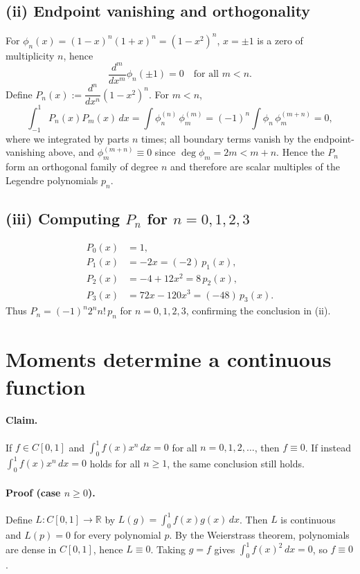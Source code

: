 \documentclass[11pt,a4paper]{article}
\theoremstyle{definition}
\theoremstyle{definition}
\theoremstyle{plain}
\theoremstyle{remark}
\begin{document}
\subsection*{(ii) Endpoint vanishing and orthogonality}
For \(\phi_n(x)=(1-x)^n(1+x)^n=(1-x^2)^n\),
\(x=\pm1\) is a zero of multiplicity \(n\), hence
\[
\frac{d^m}{dx^m}\phi_n(\pm1)=0\quad\text{for all }m<n.
\]
Define \(P_n(x):=\dfrac{d^n}{dx^n}(1-x^2)^n\).
For \(m<n\),
\[
\int_{-1}^{1} P_n(x)P_m(x)\,dx
=\int \phi_n^{(n)}\,\phi_m^{(m)}
=(-1)^n\!\int \phi_n\,\phi_m^{(m+n)}=0,
\]
where we integrated by parts \(n\) times; all boundary terms vanish by the endpoint-vanishing above, and \(\phi_m^{(m+n)}\equiv0\) since \(\deg\phi_m=2m<m+n\).
Hence the \(P_n\) form an orthogonal family of degree \(n\) and therefore are scalar multiples of the Legendre polynomials \(p_n\).

\subsection*{(iii) Computing \(P_n\) for \(n=0,1,2,3\)}
\[
\begin{aligned}
	P_0(x)&=1,\\
	P_1(x)&=-2x=(-2)\,p_1(x),\\
	P_2(x)&=-4+12x^2=8\,p_2(x),\\
	P_3(x)&=72x-120x^3=(-48)\,p_3(x).
\end{aligned}
\]
Thus \(P_n=(-1)^n 2^n n!\,p_n\) for \(n=0,1,2,3\), confirming the conclusion in (ii).


\section*{Moments determine a continuous function}

\paragraph{Claim.}
If \(f\in C[0,1]\) and \(\int_0^1 f(x)x^n\,dx=0\) for all \(n=0,1,2,\dots\), then \(f\equiv0\).
If instead \(\int_0^1 f(x)x^n\,dx=0\) holds for all \(n\ge1\), the same conclusion still holds.

\paragraph{Proof (case \(n\ge0\)).}
Define \(L:C[0,1]\to\mathbb R\) by \(L(g)=\int_0^1 f(x)g(x)\,dx\).
Then \(L\) is continuous and \(L(p)=0\) for every polynomial \(p\).
By the Weierstrass theorem, polynomials are dense in \(C[0,1]\), hence \(L\equiv0\).
Taking \(g=f\) gives \(\int_0^1 f(x)^2\,dx=0\), so \(f\equiv0\).
\end{document}
